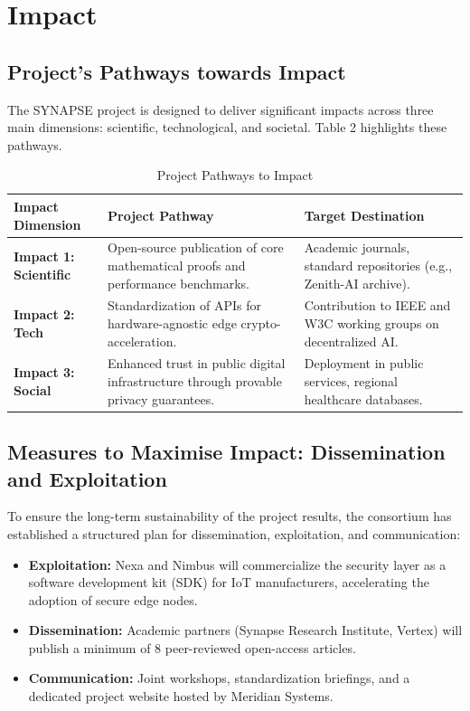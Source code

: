 \section{Impact}
\label{sec:impact}

\subsection{Project's Pathways towards Impact}
\label{sec:pathways}

The SYNAPSE project is designed to deliver significant impacts across three main dimensions: scientific, technological, and societal. Table 2 highlights these pathways.

\begin{table}[h]
\caption{Project Pathways to Impact}
\label{tab:pathways}
\begin{tabularx}{\textwidth}{l X p{5.5cm}}
\toprule
\textbf{Impact Dimension} & \textbf{Project Pathway} & \textbf{Target Destination} \\
\midrule
\textbf{Impact 1: Scientific} & Open-source publication of core mathematical proofs and performance benchmarks. & Academic journals, standard repositories (e.g., Zenith-AI archive). \\
\textbf{Impact 2: Tech} & Standardization of APIs for hardware-agnostic edge crypto-acceleration. & Contribution to IEEE and W3C working groups on decentralized AI. \\
\textbf{Impact 3: Social} & Enhanced trust in public digital infrastructure through provable privacy guarantees. & Deployment in public services, regional healthcare databases. \\
\bottomrule
\end{tabularx}
\end{table}

\subsection{Measures to Maximise Impact: Dissemination and Exploitation}
\label{sec:measures}

To ensure the long-term sustainability of the project results, the consortium has established a structured plan for dissemination, exploitation, and communication:
\begin{itemize}
    \item \textbf{Exploitation:} Nexa and Nimbus will commercialize the security layer as a software development kit (SDK) for IoT manufacturers, accelerating the adoption of secure edge nodes.
    \item \textbf{Dissemination:} Academic partners (Synapse Research Institute, Vertex) will publish a minimum of 8 peer-reviewed open-access articles.
    \item \textbf{Communication:} Joint workshops, standardization briefings, and a dedicated project website hosted by Meridian Systems.
\end{itemize}

